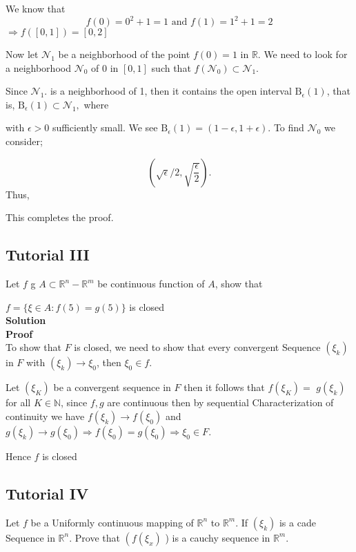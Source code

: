 \documentclass{article}
\begin{document}
We know that 
$$f(0)=0^2+1 =1 \text{ and } f(1)=1^2+1 =2$$
$ \Longrightarrow f(\left[0,1\right]) = \left[  0,2 \right] $


Now let $\mathcal{N}_1$  be a neighborhood of the point $f(0) = 1$ in $\mathbb{R}$. We need to look for a neighborhood $\mathcal{N}_0$ of
0 in $\left[ 0, 1 \right]$ such that $f(\mathcal{N}_0)\subset \mathcal{N}_1.$

Since $\mathcal{N}_1.$ is a neighborhood of 1, then it contains the open interval $\mathrm{B}_\epsilon (1)$, that is, $\mathrm{B}_\epsilon (1) \subset \mathcal{N}_1,$ where

with $\epsilon > 0$ sufficiently small. We see $\mathrm{B}_\epsilon (1) = (1 − \epsilon, 1 + \epsilon).$ To find $\mathcal{N}_0$ we consider;

$$ (\sqrt{\epsilon}/2 , \sqrt{\frac{\epsilon}{2}}).$$
Thus,

This completes the proof. 








\subsection{Tutorial III}

Let $f$ g $A \subset \mathbb{R}^{n}-\mathbb{R}^{m}$ be continuous function of $A$, show that

$f=\{\xi \in A: f(5)=g(5)\}$ is closed\\

\textbf{Solution}\\

\textbf{Proof}\\
To show that $F$ is closed, we need to show that every convergent Sequence $\left(\xi_{k}\right)$ in $F$ with $\left(\xi_{k}\right) \rightarrow \xi_{0}$, then $\xi_{0} \in f$.

Let $\left(\xi_{K}\right)$ be a convergent sequence in $F$ then it follows that $f\left(\xi_{K}\right)=$ $g\left(\xi_{k}\right)$ for all $K \in \mathbb{N}$, since $f, g$ are continuous then by sequential Characterization of continuity we have $f\left(\xi_{k}\right) \rightarrow f\left(\xi_{0}\right)$ and $g\left(\xi_{k}\right) \rightarrow g\left(\xi_{0}\right) \Rightarrow f\left(\xi_{0}\right)=g\left(\xi_{0}\right) \Rightarrow \xi_{0} \in F$.

Hence $f$ is  closed

\subsection{Tutorial IV}
Let $f$ be a Uniformly continuous mapping of $\mathbb{R}^{n}$ to $\mathbb{R}^{m}$. If $\left(\xi_{k}\right)$ is a cade Sequence in $\mathbb{R}^{n}$. Prove that $\left(f\left(\xi_{x}\right)\right.$ ) is a cauchy sequence in $\mathbb{R}^{m}$.
\end{document}
